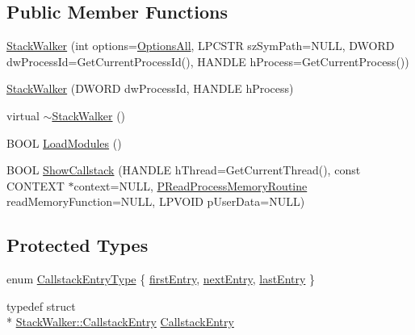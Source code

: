 \subsection*{Public Member Functions}
\begin{DoxyCompactItemize}
\item 
\hyperlink{class_stack_walker_a70ca0d3bd1d2b015815fc951ab0442df}{Stack\-Walker} (int options=\hyperlink{class_stack_walker_aa09267d1a2142548625d11131fd9f6d2a2955cdf5dd2683a3951f89d41d8b9c3c}{Options\-All}, L\-P\-C\-S\-T\-R sz\-Sym\-Path=N\-U\-L\-L, D\-W\-O\-R\-D dw\-Process\-Id=Get\-Current\-Process\-Id(), H\-A\-N\-D\-L\-E h\-Process=Get\-Current\-Process())
\item 
\hyperlink{class_stack_walker_af36f5f0c916b2f350363c7ec8a8de15a}{Stack\-Walker} (D\-W\-O\-R\-D dw\-Process\-Id, H\-A\-N\-D\-L\-E h\-Process)
\item 
virtual \hyperlink{class_stack_walker_ae208af01c973541f335e5391677f2492}{$\sim$\-Stack\-Walker} ()
\item 
B\-O\-O\-L \hyperlink{class_stack_walker_a3e0e7f1329f594d89362309bf8fe2b21}{Load\-Modules} ()
\item 
B\-O\-O\-L \hyperlink{class_stack_walker_a26bacb66734ee2d1de20d51070b825ba}{Show\-Callstack} (H\-A\-N\-D\-L\-E h\-Thread=Get\-Current\-Thread(), const C\-O\-N\-T\-E\-X\-T $\ast$context=N\-U\-L\-L, \hyperlink{class_stack_walker_a61956985807c0d6c582304c78c6dc85c}{P\-Read\-Process\-Memory\-Routine} read\-Memory\-Function=N\-U\-L\-L, L\-P\-V\-O\-I\-D p\-User\-Data=N\-U\-L\-L)
\end{DoxyCompactItemize}
\subsection*{Protected Types}
\begin{DoxyCompactItemize}
\item 
enum \hyperlink{class_stack_walker_a6de6dcd460d11abee0c498fb55cba96e}{Callstack\-Entry\-Type} \{ \hyperlink{class_stack_walker_a6de6dcd460d11abee0c498fb55cba96eaa638808af6959ce776853d2b1c706bba}{first\-Entry}, 
\hyperlink{class_stack_walker_a6de6dcd460d11abee0c498fb55cba96ea3f79f8f3d18eca44ec7d1c4f403edd37}{next\-Entry}, 
\hyperlink{class_stack_walker_a6de6dcd460d11abee0c498fb55cba96ea953ece8d7477db020bbe434a96ad7803}{last\-Entry}
 \}
\item 
typedef struct \\*
\hyperlink{struct_stack_walker_1_1_callstack_entry}{Stack\-Walker\-::\-Callstack\-Entry} \hyperlink{class_stack_walker_ad0ad9c321961aad36f54779a8ca4ec12}{Callstack\-Entry}
\end{DoxyCompactItemize}
